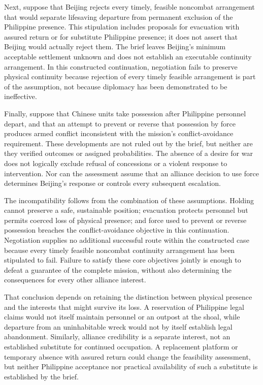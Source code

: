 \documentclass[11pt]{article}
\begin{document}
Next, suppose that Beijing rejects every timely, feasible noncombat arrangement that would separate lifesaving departure from permanent exclusion of the Philippine presence. This stipulation includes proposals for evacuation with assured return or for substitute Philippine presence; it does not assert that Beijing would actually reject them. The brief leaves Beijing\textquoteright{}s minimum acceptable settlement unknown and does not establish an executable continuity arrangement. In this constructed continuation, negotiation fails to preserve physical continuity because rejection of every timely feasible arrangement is part of the assumption, not because diplomacy has been demonstrated to be ineffective.

Finally, suppose that Chinese units take possession after Philippine personnel depart, and that an attempt to prevent or reverse that possession by force produces armed conflict inconsistent with the mission\textquoteright{}s conflict-avoidance requirement. These developments are not ruled out by the brief, but neither are they verified outcomes or assigned probabilities. The absence of a desire for war does not logically exclude refusal of concessions or a violent response to intervention. Nor can the assessment assume that an alliance decision to use force determines Beijing\textquoteright{}s response or controls every subsequent escalation.

The incompatibility follows from the combination of these assumptions. Holding cannot preserve a safe, sustainable position; evacuation protects personnel but permits coerced loss of physical presence; and force used to prevent or reverse possession breaches the conflict-avoidance objective in this continuation. Negotiation supplies no additional successful route within the constructed case because every timely feasible noncombat continuity arrangement has been stipulated to fail. Failure to satisfy these core objectives jointly is enough to defeat a guarantee of the complete mission, without also determining the consequences for every other alliance interest.

That conclusion depends on retaining the distinction between physical presence and the interests that might survive its loss. A reservation of Philippine legal claims would not itself maintain personnel or an outpost at the shoal, while departure from an uninhabitable wreck would not by itself establish legal abandonment. Similarly, alliance credibility is a separate interest, not an established substitute for continued occupation. A replacement platform or temporary absence with assured return could change the feasibility assessment, but neither Philippine acceptance nor practical availability of such a substitute is established by the brief.
\end{document}
